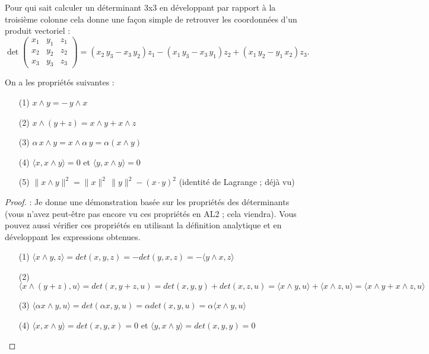 \documentclass[class=report,crop=false]{standalone}
\begin{document}
Pour qui sait calculer un déterminant 3x3 en développant par rapport \`a la troisi\`eme colonne cela donne une façon simple de retrouver les coordonnées d'un produit vectoriel :
 $$
 \det \left( \begin{array}{ccc}
x_1& y_1 & z_1 \\
x_{2} & y_{2} & z_2 \\
x_{3} & y_{3} & z_3
\end{array}
\right)=(x_{2}\,y_{3} - x_{3}\,y_{2})z_1-(x_{1}\,y_{3} - x_{3}\,y_{1})z_2+(x_{1}\,y_{2} - y_{1}\,x_{2})z_3.
$$


\begin{theoreme}
On a les propriétés suivantes :
\begin{enumerate}
\item[(1)] $x \land y = -\, y \land x$
\item[(2)] $x \land (y + z) = x \land y + x \land z$
\item[(3)] $\alpha\,x \land y = x \land \alpha\, y = \alpha (x \land y)$
\item[(4)] $\langle x,  x \land y \rangle= 0$ et $\langle y ,x \land y\rangle = 0$
\item[(5)] $\|x \land y\|^2 = \|x\|^2\, \|y\|^2 - (x \cdot y)^2$ (identité de Lagrange ; déj\`a vu)
\end{enumerate}
\end{theoreme}

\begin{proof} \rm : Je donne une démonstration basée sur les propriétés des déterminants (vous n'avez peut-être pas encore vu ces propriétés en AL2 ; cela viendra). Vous pouvez aussi vérifier ces propriétés en utilisant la définition  analytique et en développant les expressions obtenues.

\begin{enumerate}
\item[(1)] $\langle x \land y ,z\rangle =det(x,y,z)=-det(y,x,z)= -\langle y \land x ,z\rangle$
\item[(2)] $\langle x \land (y + z) ,u\rangle = det(x,y+z,u)=det(x,y,y)+det(x,z,u)= \langle x \land y ,u\rangle+\langle x \land z ,u\rangle=\langle x \land y+ x \land z ,u\rangle$
\item[(3)] $\langle \alpha x \land y  ,u\rangle  = det(\alpha x,y,u)=\alpha det(x,y,u)= \alpha\langle x \land y ,u\rangle$
\item[(4)] $\langle x,  x \land y \rangle= det(x,y,x)=0$ et $\langle y ,x \land y\rangle = det(x,y,y)=0$
\end{enumerate}
\end{proof}
\end{document}
